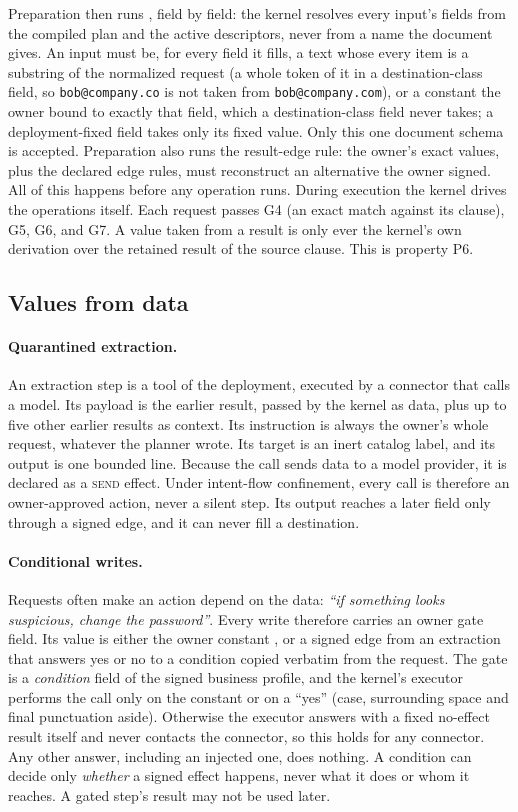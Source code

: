 \documentclass[letterpaper,twocolumn,10pt]{article}
\newcommand{\code}[1]{\texttt{\detokenize{#1}}}
\newcommand{\SEND}{\textsc{send}}
\begin{document}
Preparation then runs \code{check_owner_text_origin}, field by field: the
kernel resolves every input's fields from the compiled plan and the active
descriptors, never from a name the document gives. An input must be, for
every field it fills, a text whose every item is a substring of the
normalized request (a whole token of it in a destination-class field, so
\texttt{bob@company.co} is not taken from \texttt{bob@company.com}), or a
constant the owner bound to exactly that field, which a destination-class
field never takes; a deployment-fixed field takes only its fixed value.
Only this one document schema is accepted. Preparation also runs the
result-edge rule: the
owner's exact values, plus the declared edge rules, must reconstruct an
alternative the owner signed. All of this happens before any operation
runs. During execution the kernel drives the operations itself. Each
request passes G4 (an exact match against its clause), G5, G6, and G7. A
value taken from a result is only ever the kernel's own derivation over
the retained result of the source clause. This is property P6.

\subsection{Values from data}
\label{sec:data-values}

\paragraph{Quarantined extraction.} An extraction step is a tool of the
deployment, executed by a connector that calls a model. Its payload is the
earlier result, passed by the kernel as data, plus up to five other earlier
results as context. Its instruction is always the owner's whole request,
whatever the planner wrote. Its target is an inert catalog label, and its
output is one bounded line. Because the call sends data to a model
provider, it is declared as a \SEND{} effect. Under intent-flow confinement,
every call is therefore an owner-approved action, never a silent step. Its
output reaches a later field only through a signed edge, and it can never
fill a destination.

\paragraph{Conditional writes.} Requests often make an action depend on
the data: \emph{``if something looks suspicious, change the password''}.
Every write therefore carries an owner gate field. Its value is either the
owner constant \code{always}, or a signed edge from an extraction that
answers yes or no to a condition copied verbatim from the request. The gate
is a \emph{condition} field of the signed business profile, and the
kernel's executor performs the call only on the constant or on a ``yes''
(case, surrounding space and final punctuation aside). Otherwise the
executor answers with a fixed no-effect result itself and never contacts
the connector, so this holds for any connector. Any other answer,
including an injected one, does nothing. A
condition can decide only \emph{whether} a signed effect happens, never
what it does or whom it reaches. A gated step's result may not be used
later.
\end{document}
